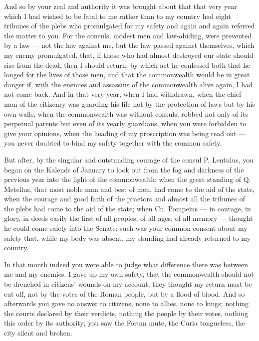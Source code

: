  And so by your zeal and authority it was brought about that that very year which I had wished to be fatal to me rather than to my country had eight tribunes of the plebs who promulgated for my safety and again and again referred the matter to you. For the consuls, modest men and law-abiding, were prevented by a law --- not the law against me, but the law passed against themselves, which my enemy promulgated, that, if those who had almost destroyed our state should rise from the dead, then I should return: by which act he confessed both that he longed for the lives of those men, and that the commonwealth would be in great danger if, with the enemies and assassins of the commonwealth alive again, I had not come back. And in that very year, when I had withdrawn, when the chief man of the citizenry was guarding his life not by the protection of laws but by his own walls, when the commonwealth was without consuls, robbed not only of its perpetual parents but even of its yearly guardians, when you were forbidden to give your opinions, when the heading of my proscription was being read out --- you never doubted to bind my safety together with the common safety.

 But after, by the singular and outstanding courage of the consul P. Lentulus, you began on the Kalends of January to look out from the fog and darkness of the previous year into the light of the commonwealth; when the great standing of Q. Metellus, that most noble man and best of men, had come to the aid of the state, when the courage and good faith of the praetors and almost all the tribunes of the plebs had come to the aid of the state; when Cn. Pompeius --- in courage, in glory, in deeds easily the first of all peoples, of all ages, of all memory --- thought he could come safely into the Senate: such was your common consent about my safety that, while my body was absent, my standing had already returned to my country.

 In that month indeed you were able to judge what difference there was between me and my enemies. I gave up my own safety, that the commonwealth should not be drenched in citizens' wounds on my account; they thought my return must be cut off, not by the votes of the Roman people, but by a flood of blood. And so afterwards you gave no answer to citizens, none to allies, none to kings; nothing the courts declared by their verdicts, nothing the people by their votes, nothing this order by its authority; you saw the Forum mute, the Curia tongueless, the city silent and broken.

